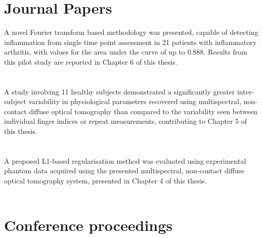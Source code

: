 \documentclass[twoside]{bhamthesis}
\theoremstyle{definition}
\begin{document}
\begin{publications}

\section*{Journal Papers}

A novel Fourier transform based methodology was presented, capable of detecting inflammation from single time point assessment in 21 patients with inflammatory arthritis, with values for the area under the curve of up to 0.888. Results from this pilot study are reported in Chapter 6 of this thesis.
\\
\\
\\

A study involving 11 healthy subjects demonstrated a significantly greater inter-subject variability in physiological parameters recovered using multispectral, non-contact diffuse optical tomography than compared to the variability seen between individual finger indices or repeat measurements, contributing to Chapter 5 of this thesis.
\\
\\
\\

A proposed L1-based regularisation method was evaluated using experimental phantom data acquired using the presented multispectral, non-contact diffuse optical tomography system, presented in Chapter 4 of this thesis.
\\
\\

\section*{Conference proceedings}


\end{publications}
\end{document}
